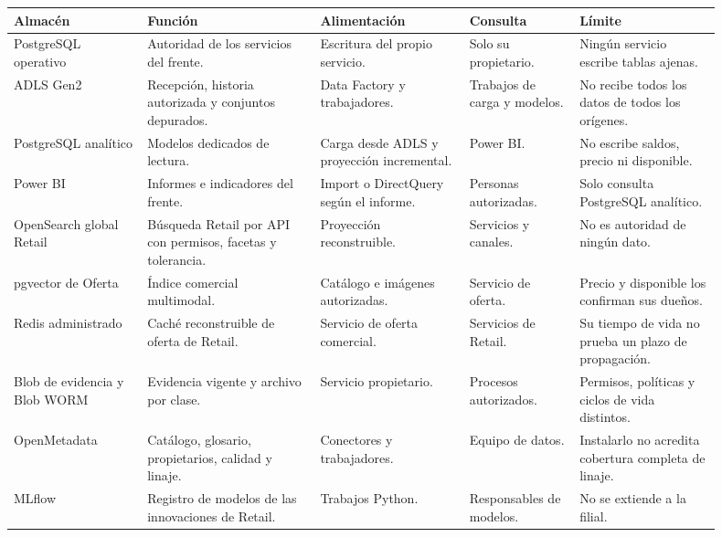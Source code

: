 \documentclass[11pt]{article}
\begin{document}
\begin{longtable}{@{}p{0.17\linewidth}p{0.22\linewidth}p{0.19\linewidth}p{0.14\linewidth}p{0.18\linewidth}@{}}
\toprule Almacén & Función & Alimentación & Consulta & Límite \\
\midrule\endhead\bottomrule\endlastfoot
PostgreSQL operativo & Autoridad de los servicios del frente. & Escritura del propio servicio. & Solo su propietario. & Ningún servicio escribe tablas ajenas. \\
ADLS Gen2 & Recepción, historia autorizada y conjuntos depurados. & Data Factory y trabajadores. & Trabajos de carga y modelos. & No recibe todos los datos de todos los orígenes. \\
PostgreSQL analítico & Modelos dedicados de lectura. & Carga desde ADLS y proyección incremental. & Power BI. & No escribe saldos, precio ni disponible. \\
Power BI & Informes e indicadores del frente. & Import o DirectQuery según el informe. & Personas autorizadas. & Solo consulta PostgreSQL analítico. \\
OpenSearch global Retail & Búsqueda Retail por API con permisos, facetas y tolerancia. & Proyección reconstruible. & Servicios y canales. & No es autoridad de ningún dato. \\
pgvector de Oferta & Índice comercial multimodal. & Catálogo e imágenes autorizadas. & Servicio de oferta. & Precio y disponible los confirman sus dueños. \\
Redis administrado & Caché reconstruible de oferta de Retail. & Servicio de oferta comercial. & Servicios de Retail. & Su tiempo de vida no prueba un plazo de propagación. \\
Blob de evidencia y Blob WORM & Evidencia vigente y archivo por clase. & Servicio propietario. & Procesos autorizados. & Permisos, políticas y ciclos de vida distintos. \\
OpenMetadata & Catálogo, glosario, propietarios, calidad y linaje. & Conectores y trabajadores. & Equipo de datos. & Instalarlo no acredita cobertura completa de linaje. \\
MLflow & Registro de modelos de las innovaciones de Retail. & Trabajos Python. & Responsables de modelos. & No se extiende a la filial. \\
\end{longtable}
\end{document}
